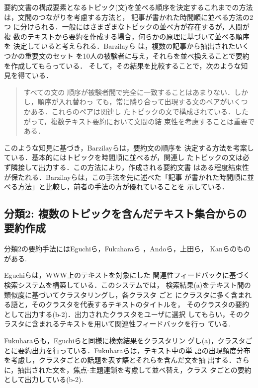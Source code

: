 要約文書の構成要素となるトピック(文)を並べる順序を決定するこれまでの方法
は，文間のつながりを考慮する方法\cite{goldstein:00:a,stein:99:a}と，
記事が書かれた時間順に並べる方法\cite{radev:00:a,mckeown:99:a}の2つ
に分けられる．一般にはさまざまなトピックの並べ方が存在するが，人間が複
数のテキストから要約を作成する場合，何らかの原理に基づいて並べる順序を
決定していると考えられる．Barzilayら
\cite{barzilay:01:a}は，複数の記事から抽出されたいくつかの重要文のセット
を10人の被験者に与え，それらを並べ換えることで要約を作成してもらっている．
そして，その結果を比較することで，次のような知見を得ている．
\begin{quote}
すべての文の
順序が被験者間で完全に一致することはあまりない．しかし，順序が入れ替わっ
ても，常に隣り合って出現する文のペアがいくつかある．これらのペアは関連し
たトピックの文で構成されている．したがって，複数テキスト要約において文間の結
束性を考慮することは重要である．
\end{quote}

このような知見に基づき，Barzilayら\cite{barzilay:01:a}は，要約文の順序を
決定する方法を考案している．基本的にはトピックを時間順に並べるが，関連し
たトピックの文は必ず隣接して出力する．この方法により，作成される要約文書
はある程度結束性が保たれる．Barzilayらは，この手法を先に述べた「記事
が書かれた時間順に並べる方法」と比較し，前者の手法の方が優れていることを
示している．

\subsection*{分類2: 複数のトピックを含んだテキスト集合からの要約作成}

分類2の要約手法にはEguchiら\cite{eguchi:99:a}，Fukuharaら
\cite{fukuhara:99:a}，Andoら\cite{ando:00:a}，上田ら\cite{ueda:00:a}，
Kanら\cite{kan:01:a}のものがある.

Eguchiら\cite{eguchi:99:a}は，WWW上のテキストを対象にした
関連性フィードバックに基づく検索システムを構築している．このシステムでは，
検索結果(a)をテキスト間の類似度に基づいてクラスタリングし，各クラスタ
ごと
にクラスタに多く含まれる語と，そのクラスタを代表するテキストのタイトルを，
そのクラスタの要約として出力する(b-2)．出力されたクラスタをユーザに選択
してもらい，そのクラスタに含まれるテキストを用いて関連性フィードバックを行っ
ている.

Fukuharaら\cite{fukuhara:99:a}も，Eguchiらと同様に検索結果をクラスタリン
グし(a)，クラスタごとに要約出力を行っている．Fukuharaらは，テキスト中の単
語の出現頻度分布を考慮し，クラスタごとの話題を表す語とそれらを含んだ文を抽
出する．さらに，抽出された文を，焦点-主題連鎖を考慮して並べ替え，クラス
タごとの要約として出力している(b-2).


